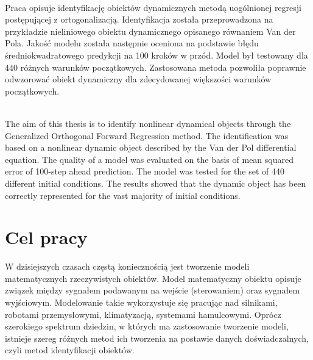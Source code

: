 



\renewcommand{\tablename}{Tabela}

\pagestyle{empty}
\stronatytulowa

\newpage
\setcounter{page}{1}

\newpage
\textbf{\tytulpl} \vspace*{0.2cm} \\
Praca opisuje identyfikację obiektów dynamicznych metodą uogólnionej regresji postępującej z ortogonalizacją. Identyfikacja została przeprowadzona na przykładzie nieliniowego obiektu dynamicznego opisanego równaniem Van der Pola. Jakość modelu została następnie oceniona na podstawie błędu średniokwadratowego predykcji na 100 kroków w przód. Model był testowany dla 440 różnych warunków początkowych. Zastosowana metoda pozwoliła poprawnie odwzorować obiekt dynamiczny dla zdecydowanej większości warunków początkowych.

\vspace*{2cm}
\textbf{\tytulen} \vspace*{0.2cm} \\
The aim of this thesis is to identify nonlinear dynamical objects through the Generalized Orthogonal Forward Regression method. The identification was based on a nonlinear dynamic object described by the Van der Pol differential equation.  The quality of a model was evaluated on the basis of mean squared error of 100-step ahead prediction. The model was tested for the set of 440 different initial conditions. The results showed that the dynamic object has been correctly represented for the vast majority of initial conditions.

\newpage
\tableofcontents

\newpage
\pagestyle{plain}

\section{Cel pracy}
	W dzisiejszych czasach częstą koniecznością jest tworzenie modeli matematycznych rzeczywistych obiektów. Model matematyczny obiektu opisuje związek między sygnałem podawanym na wejście (sterowaniem) oraz sygnałem wyjściowym. Modelowanie takie wykorzystuje się pracując nad silnikami, robotami przemysłowymi, klimatyzacją, systemami hamulcowymi\cite{Isermann}. Oprócz szerokiego spektrum dziedzin, w których ma zastosowanie tworzenie modeli, istnieje szereg różnych metod ich tworzenia na postawie danych doświadczalnych, czyli metod identyfikacji obiektów.
	
